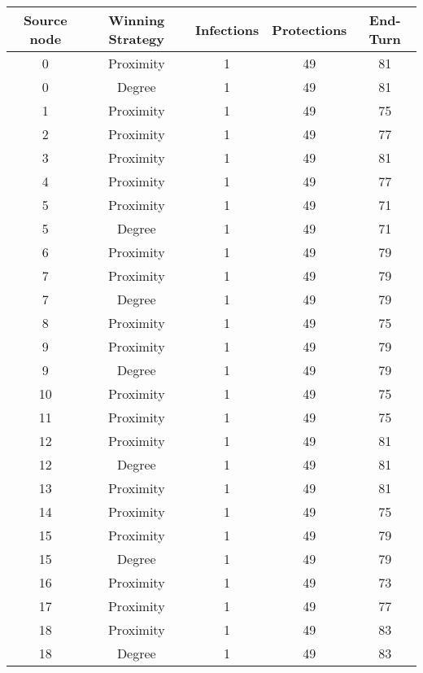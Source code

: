 \documentclass[results.tex]{subfiles}
\begin{document}
\begin{center}
  \begin{tabular}{| c || c | c | c | c |}
    \hline
    {\bfseries Source node} & {\bfseries Winning Strategy} & {\bfseries Infections} & {\bfseries Protections} & {\bfseries End-Turn} \\  %
    \hline\hline
    0 & Proximity & 1 & 49 & 81 \\ 
    \hline
    0 & Degree & 1 & 49 & 81 \\ 
    \hline
    1 & Proximity & 1 & 49 & 75 \\ 
    \hline
    2 & Proximity & 1 & 49 & 77 \\ 
    \hline
    3 & Proximity & 1 & 49 & 81 \\ 
    \hline
    4 & Proximity & 1 & 49 & 77 \\ 
    \hline
    5 & Proximity & 1 & 49 & 71 \\ 
    \hline
    5 & Degree & 1 & 49 & 71 \\ 
    \hline
    6 & Proximity & 1 & 49 & 79 \\ 
    \hline
    7 & Proximity & 1 & 49 & 79 \\ 
    \hline
    7 & Degree & 1 & 49 & 79 \\ 
    \hline
    8 & Proximity & 1 & 49 & 75 \\ 
    \hline
    9 & Proximity & 1 & 49 & 79 \\ 
    \hline
    9 & Degree & 1 & 49 & 79 \\ 
    \hline
    10 & Proximity & 1 & 49 & 75 \\ 
    \hline
    11 & Proximity & 1 & 49 & 75 \\ 
    \hline
    12 & Proximity & 1 & 49 & 81 \\ 
    \hline
    12 & Degree & 1 & 49 & 81 \\ 
    \hline
    13 & Proximity & 1 & 49 & 81 \\ 
    \hline
    14 & Proximity & 1 & 49 & 75 \\ 
    \hline
    15 & Proximity & 1 & 49 & 79 \\ 
    \hline
    15 & Degree & 1 & 49 & 79 \\ 
    \hline
    16 & Proximity & 1 & 49 & 73 \\ 
    \hline
    17 & Proximity & 1 & 49 & 77 \\ 
    \hline
    18 & Proximity & 1 & 49 & 83 \\ 
    \hline
    18 & Degree & 1 & 49 & 83 \\ 
    \hline

\end{tabular}
\end{center}
\end{document}
